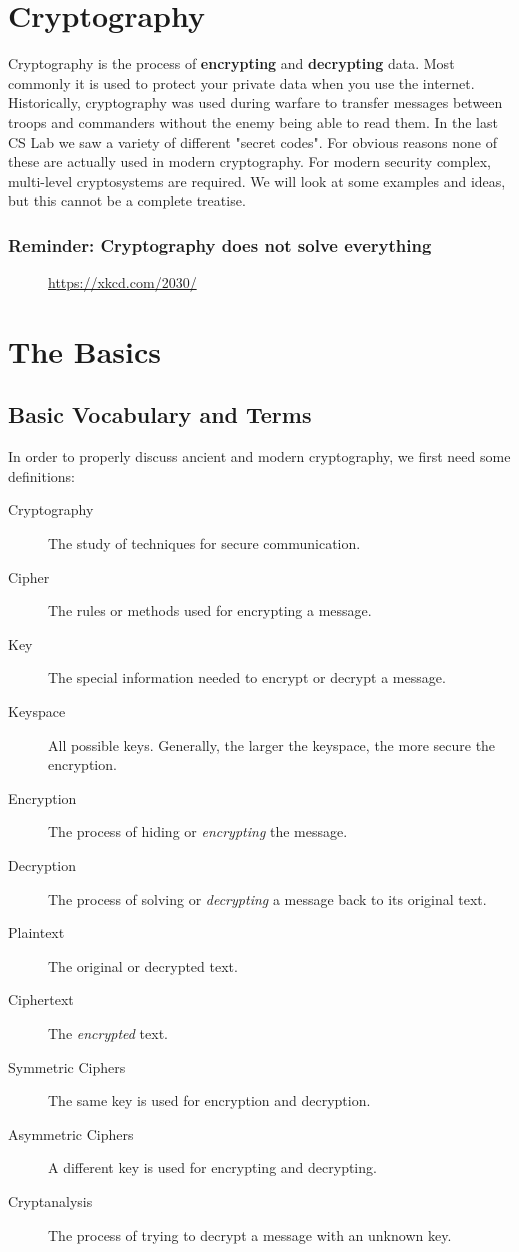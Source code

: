 \documentclass[11pt,a4paper]{report}
\begin{document}
\section{Cryptography}
Cryptography is the process of {\bf encrypting} and {\bf decrypting} data.
Most commonly it is used to protect your private data when you use the internet.
Historically, cryptography was used during warfare to transfer messages between troops and commanders without the enemy being able to read them.
In the last CS Lab we saw a variety of different "secret codes".
For obvious reasons none of these are actually used in modern cryptography. For modern security complex, multi-level cryptosystems are required.
We will look at some examples and ideas, but this cannot be a complete treatise.
\subsubsection{Reminder: Cryptography does not solve everything}

\begin{figure}[h]
\caption{\url{https://xkcd.com/2030/}}
\end{figure}

\newpage
\section{The Basics}
\subsection{Basic Vocabulary and Terms}
In order to properly discuss ancient and modern cryptography, we first need some definitions: 
\begin{description}
\item[Cryptography] The study of techniques for secure communication.
\item[Cipher] The rules or methods used for encrypting a message.
\item[Key] The special information needed to encrypt or decrypt a message.
\item[Keyspace] All possible keys.
Generally, the larger the keyspace, the more secure the encryption.
\item[Encryption] The process of hiding or \emph{encrypting} the message.
\item[Decryption] The process of solving or \emph{decrypting} a message back to its original text.
\item[Plaintext] The original or decrypted text.
\item[Ciphertext] The \emph{encrypted} text.
\item[Symmetric Ciphers] The same key is used for encryption and decryption.
\item[Asymmetric Ciphers] A different key is used for encrypting and decrypting.
\item[Cryptanalysis] The process of trying to decrypt a message with an unknown key.
\end{description}
\end{document}
